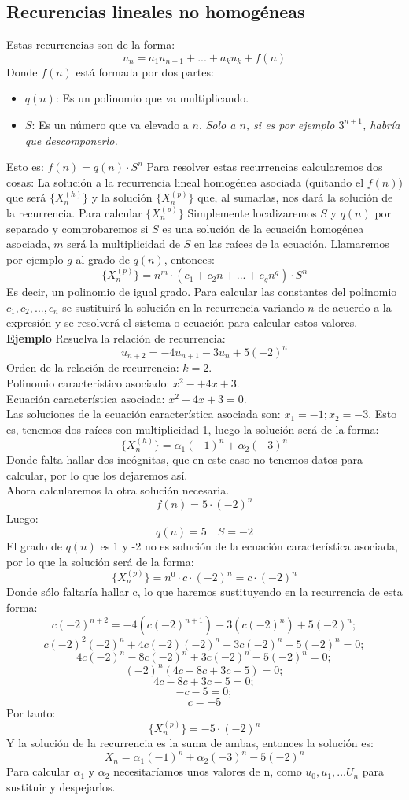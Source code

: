\documentclass[a4paper]{article}
\begin{document}
\subsection{Recurencias lineales no homogéneas}
Estas recurrencias son de la forma:
$$u_n=a_1u_{n-1}+...+a_ku_k+f(n)$$
Donde $f(n)$ está formada por dos partes:
\begin{itemize}
\item $q(n)$: Es un polinomio que va multiplicando.
\item $S$: Es un número que va elevado a $n$. \emph{Solo a $n$, si es por ejemplo $3^{n+1}$, habría que descomponerlo.}
\end{itemize}
Esto es: $f(n)=q(n)\cdot S^n$
Para resolver estas recurrencias calcularemos dos cosas: La solución a la recurrencia lineal homogénea asociada (quitando el $f(n)$) que será $\{X_n^{(h)}\}$ y la solución $\{X_n^{(p)}\}$ que, al sumarlas, nos dará la solución de la recurrencia.
Para calcular $\{X_n^{(p)}\}$ Simplemente localizaremos $S$ y $q(n)$ por separado y comprobaremos si $S$ es una solución de la ecuación homogénea asociada, $m$ será la multiplicidad de $S$ en las raíces de la ecuación. Llamaremos por ejemplo $g$ al grado de $q(n)$, entonces:
$$\{X_n^{(p)}\}=n^m\cdot (c_1+c_2n+...+c_gn^g)\cdot S^n$$
Es decir, un polinomio de igual grado. Para calcular las constantes del polinomio $c_1,c_2,...,c_n$ se sustituirá la solución en la recurrencia variando $n$ de acuerdo a la expresión y se resolverá el sistema o ecuación para calcular estos valores.\\

\large{\textbf{Ejemplo}}
Resuelva la relación de recurrencia:
$$u_{n+2}=-4u_{n+1}-3u_n+5(-2)^n$$
Orden de la relación de recurrencia: $k=2$.\\
Polinomio característico asociado: $x^2-+4x+3$.\\
Ecuación característica asociada: $x^2+4x+3=0$.\\
Las soluciones de la ecuación característica asociada son: $x_1= -1; x_2=-3$. Esto es, tenemos dos raíces con multiplicidad 1, luego la solución será de la forma:
$$\{X_n^{(h)}\}=\alpha_1(-1)^n+\alpha_2(-3)^n$$
Donde falta hallar dos incógnitas, que en este caso no tenemos datos para calcular, por lo que los dejaremos así.\\
Ahora calcularemos la otra solución necesaria.
$$f(n)=5\cdot (-2)^n$$
Luego:
$$q(n)= 5 \quad S=-2$$
El grado de $q(n)$ es 1 y -2 no es solución de la ecuación característica asociada, por lo que la solución será de la forma:
$$\{X_n^{(p)}\}=n^0\cdot c\cdot (-2)^n=c\cdot (-2)^n$$
Donde sólo faltaría hallar c, lo que haremos sustituyendo en la recurrencia de esta forma:
$$c(-2)^{n+2}=-4(c(-2)^{n+1})-3(c(-2)^n)+5(-2)^n;$$
$$c(-2)^2(-2)^n+4c(-2)(-2)^n+3c(-2)^n-5(-2)^n=0;$$
$$4c(-2)^n-8c(-2)^n+3c(-2)^n-5(-2)^n=0;$$
$$(-2)^n(4c-8c+3c-5)=0;$$
$$4c-8c+3c-5=0;$$
$$-c-5=0;$$
$$c=-5$$
Por tanto:
$$\{X_n^{(p)}\}=-5\cdot (-2)^n$$
Y la solución de la recurrencia es la suma de ambas, entonces la solución es:
$$X_n=\alpha_1(-1)^n+\alpha_2(-3)^n-5(-2)^n$$
Para calcular $\alpha_1$ y $\alpha_2$ necesitaríamos unos valores de n, como $u_0, u_1,\ldots U_n$ para sustituir y despejarlos.
\end{document}
